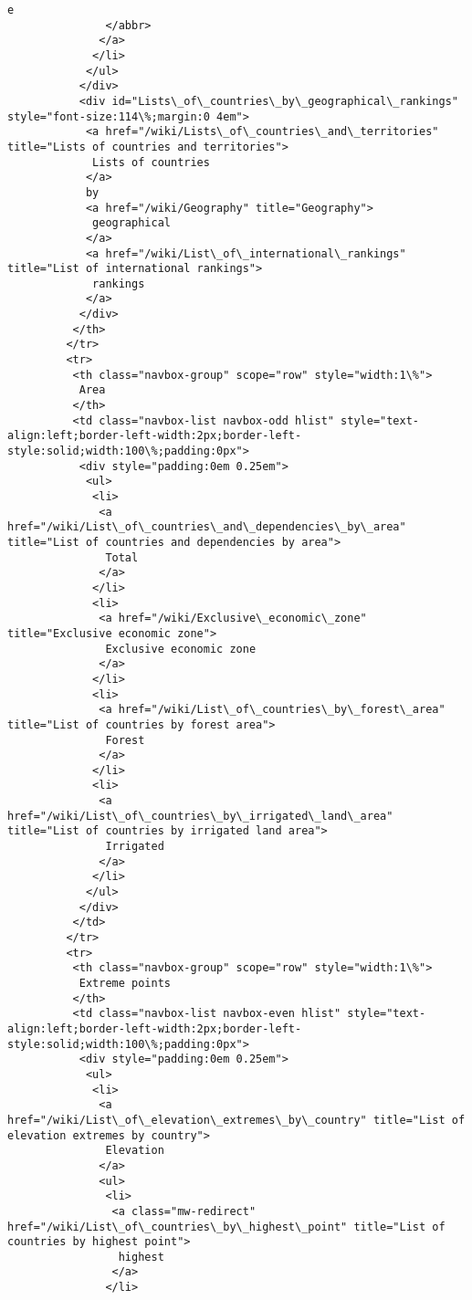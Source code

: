 \documentclass[11pt]{article}
\begin{document}
\begin{Verbatim}[commandchars=\\\{\}]
                e
               </abbr>
              </a>
             </li>
            </ul>
           </div>
           <div id="Lists\_of\_countries\_by\_geographical\_rankings" style="font-size:114\%;margin:0 4em">
            <a href="/wiki/Lists\_of\_countries\_and\_territories" title="Lists of countries and territories">
             Lists of countries
            </a>
            by
            <a href="/wiki/Geography" title="Geography">
             geographical
            </a>
            <a href="/wiki/List\_of\_international\_rankings" title="List of international rankings">
             rankings
            </a>
           </div>
          </th>
         </tr>
         <tr>
          <th class="navbox-group" scope="row" style="width:1\%">
           Area
          </th>
          <td class="navbox-list navbox-odd hlist" style="text-align:left;border-left-width:2px;border-left-style:solid;width:100\%;padding:0px">
           <div style="padding:0em 0.25em">
            <ul>
             <li>
              <a href="/wiki/List\_of\_countries\_and\_dependencies\_by\_area" title="List of countries and dependencies by area">
               Total
              </a>
             </li>
             <li>
              <a href="/wiki/Exclusive\_economic\_zone" title="Exclusive economic zone">
               Exclusive economic zone
              </a>
             </li>
             <li>
              <a href="/wiki/List\_of\_countries\_by\_forest\_area" title="List of countries by forest area">
               Forest
              </a>
             </li>
             <li>
              <a href="/wiki/List\_of\_countries\_by\_irrigated\_land\_area" title="List of countries by irrigated land area">
               Irrigated
              </a>
             </li>
            </ul>
           </div>
          </td>
         </tr>
         <tr>
          <th class="navbox-group" scope="row" style="width:1\%">
           Extreme points
          </th>
          <td class="navbox-list navbox-even hlist" style="text-align:left;border-left-width:2px;border-left-style:solid;width:100\%;padding:0px">
           <div style="padding:0em 0.25em">
            <ul>
             <li>
              <a href="/wiki/List\_of\_elevation\_extremes\_by\_country" title="List of elevation extremes by country">
               Elevation
              </a>
              <ul>
               <li>
                <a class="mw-redirect" href="/wiki/List\_of\_countries\_by\_highest\_point" title="List of countries by highest point">
                 highest
                </a>
               </li>

\end{Verbatim}
\end{document}
